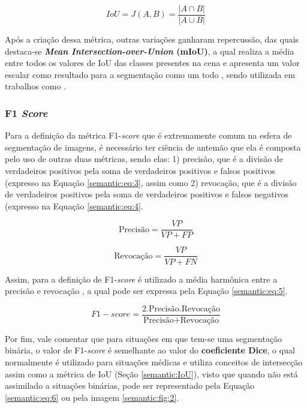 \begin{equation}
    \label{semantic:eq:2}
    IoU = J(A,B) = \frac{|A \cap B|}{|A \cup B|}
\end{equation}

Após a criação dessa métrica, outras variações ganharam repercussão, das quais destaca-se \textbf{\textit{Mean Intersection-over-Union} (mIoU)}, a qual realiza a média entre todos os valores de IoU das classes presentes na cena e apresenta um valor escalar como resultado para a segmentação como um todo \cite{Minaee2021}, sendo utilizada em trabalhos como \cite{Mohan2020}.


\subsubsection{F1 \textit{Score}}
\label{semantic:f1}

Para a definição da métrica F1-\textit{score} que é extremamente comum na esfera de segmentação de imagens, é necessário ter ciência de antemão que ela é composta pelo uso de outras duas métricas, sendo elas: 1) precisão, que é a divisão de verdadeiros positivos pela soma de verdadeiros positivos e falsos positivos (expresso na Equação \ref{semantic:eq:3}, assim como 2) revocação, que é a divisão de verdadeiros positivos pela soma de verdadeiros positivos e falsos negativos (expresso na Equação \ref{semantic:eq:4}.

\begin{equation}
    \label{semantic:eq:3}
    \text{Precisão} = \frac{VP}{VP + FP}
\end{equation}

\begin{equation}
    \label{semantic:eq:4}
    \text{Revocação} = \frac{VP}{VP + FN}
\end{equation}

Assim, para a definição de F1-\textit{score} é utilizado a média harmônica entre a precisão e revocação \cite{Minaee2021}, a qual pode ser expressa pela Equação \ref{semantic:eq:5}.

\begin{equation}
    \label{semantic:eq:5}
    F1-score = \frac{2 . \text{Precisão} . \text{Revocação}}{\text{Precisão} + \text{Revocação}}
\end{equation}

Por fim, vale comentar que para situações em que tem-se uma segmentação binária, o valor de F1-\textit{score} é semelhante ao valor do \textbf{coeficiente Dice}, o qual normalmente é utilizado para situações médicas \cite{Minaee2021} e utiliza conceitos de intersecção assim como a métrica de IoU (Seção \ref{semantic:IoU}), visto que quando não está assimilado a situações binárias, pode ser representado pela Equação \ref{semantic:eq:6} ou pela imagem \ref{semantic:fig:2}.

